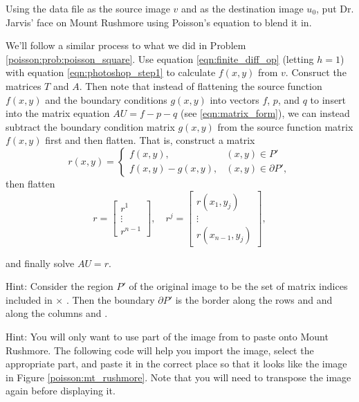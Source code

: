 \begin{problem}
Using the data file  as the source image $v$ and  as the destination image $u_0$, put Dr. Jarvis' face on Mount Rushmore using Poisson's equation to blend it in.

We'll follow a similar process to what we did in Problem \ref{poisson:prob:poisson_square}.
Use equation \eqref{eqn:finite_diff_op} (letting $h=1$) with equation \eqref{eqn:photoshop_step1} to calculate $f(x, y)$ from $v$.
Consruct the matrices $T$ and $A$.
Then note that instead of flattening the source function $f(x, y)$ and the boundary conditions $g(x, y)$ into vectors $f$, $p$, and $q$ to insert into the matrix equation $AU = f - p - q$ (see \eqref{eqn:matrix_form}), we can instead subtract the boundary condition matrix $g(x, y)$ from the source function matrix $f(x, y)$ first and then flatten.
That is, construct a matrix
\begin{equation*}
r(x, y) =
\begin{cases}
f(x, y), & (x, y) \in P'\\
f(x, y) - g(x, y), & (x, y) \in \partial P',
\end{cases}
\end{equation*}
then flatten
\begin{equation*}
r =
\begin{bmatrix}
r^1 \\ \vdots \\ r^{n-1}
\end{bmatrix}, \quad
r^j =
\begin{bmatrix}
r(x_1, y_j)\\ \vdots \\ r(x_{n-1}, y_j)
\end{bmatrix},
\end{equation*}

\noindent and finally solve $AU = r$.

Hint: Consider the region $P'$ of the original image to be the set of matrix indices included in \li{[x0, x0+w-1]} $\times$ \li{[y0, y0+w-1]}.
Then the boundary $\partial P'$ is the border along the rows  and  and along the columns  and .

Hint: You will only want to use part of the image from  to paste onto Mount Rushmore.
The following code will help you import the image, select the appropriate part, and paste it in the correct place so that it looks like the image in Figure \ref{poisson:mt_rushmore}.
Note that you will need to transpose the image again before displaying it.


\end{problem}
